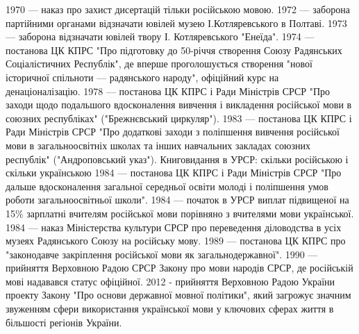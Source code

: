 1970 — наказ про захист дисертацій тільки російською мовою.
1972 — заборона партійними органами відзначати ювілей музею І.Котляревського в Полтаві.
1973 — заборона відзначати ювілей твору І. Котляревського "Енеїда".
1974 — постанова ЦК КПРС "Про підготовку до 50-річчя створення Союзу Радянських Соціалістичних Республік", де вперше проголошується створення "нової історичної спільноти — радянського народу", офіційний курс на денаціоналізацію.
1978 — постанова ЦК КПРС і Ради Міністрів СРСР "Про заходи щодо подальшого вдосконалення вивчення і викладення російської мови в союзних республіках" ("Брежнєвський циркуляр").
1983 — постанова ЦК КПРС і Ради Міністрів СРСР "Про додаткові заходи з поліпшення вивчення російської мови в загальноосвітніх школах та інших навчальних закладах союзних республік" ("Андроповський указ").
Книговидання в УРСР: скільки російською і скільки українською
1984 — постанова ЦК КПРС і Ради Міністрів СРСР "Про дальше вдосконалення загальної середньої освіти молоді і поліпшення умов роботи загальноосвітньої школи".
1984 — початок в УРСР виплат підвищеної на 15\% зарплатні вчителям російської мови порівняно з вчителями мови української.
1984 — наказ Міністерства культури СРСР про переведення діловодства в усіх музеях Радянського Союзу на російську мову.
1989 — постанова ЦК КПРС про "законодавче закріплення російської мови як загальнодержавної".
1990 — прийняття Верховною Радою СРСР Закону про мови народів СРСР, де російській мові надавався статус офіційної.
2012 - прийняття Верховною Радою України проекту Закону "Про основи державної мовної політики", який загрожує значним звуженням сфери використання української мови у ключових сферах життя в більшості регіонів України.

